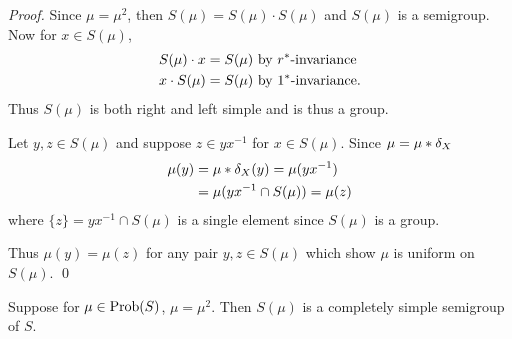 \begin{proof} Since $\mu = \mu^2$, then $S(\mu) = S(\mu)
     \cdot S(\mu)$ and $S(\mu)$ is a semigroup.  Now for
     $x \in S(\mu)$,
\[
\begin{aligned}
       S(\mu) \cdot x = S(\mu) &\hbox{ by } r^*\hbox{-invariance}  \\
       x \cdot S(\mu) = S(\mu) &\hbox{ by } 1^*\hbox{-invariance}.
\end{aligned}
\]
Thus $S(\mu)$ is both right and left simple and is thus a group.

Let $y,z \in S(\mu)$ and suppose $z \in yx^{-1}$ for $x \in S(\mu)$.  
Since $\mu = \mu * \delta_X$
\[
\begin{aligned}
       \mu(y) &= \mu * \delta_X(y) = \mu(yx^{-1})     \\
       &= \mu(yx^{-1} \cap S(\mu) ) = \mu(z)
\end{aligned}
\]
where $\{ z \} = yx^{-1} \cap S(\mu)$ is a single element since
$S(\mu)$ is a group.

Thus $\mu(y) = \mu(z)$ for any pair $y,z \in S(\mu)$ which show
$\mu$ is uniform on $S(\mu)$.
\qed
\end{proof}

\begin{theorem} 	\label{thm:3.1}
Suppose for $\mu \in \hbox{Prob}(S)$, $\mu = \mu^2$.
Then $S(\mu)$ is a completely simple semigroup of $S$.
\end{theorem}

